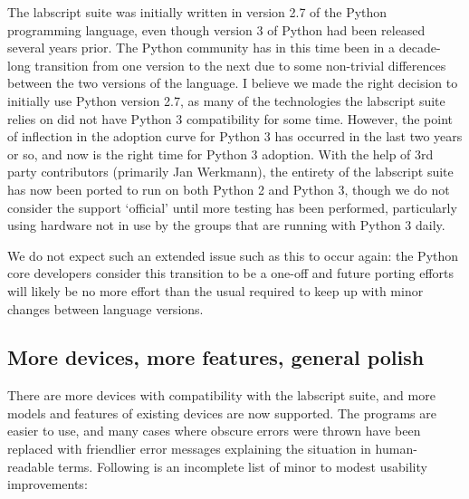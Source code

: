 The labscript suite was initially written in version 2.7 of the Python programming language, even though version 3 of Python had been released several years prior. The Python community has in this time been in a decade-long transition from one version to the next due to some non-trivial differences between the two versions of the language. I believe we made the right decision to initially use Python version 2.7, as many of the technologies the labscript suite relies on did not have Python 3 compatibility for some time. However, the point of inflection in the adoption curve for Python 3 has occurred in the last two years or so, and now is the right time for Python 3 adoption. With the help of 3rd party contributors (primarily Jan Werkmann), the entirety of the labscript suite has now been ported to run on both Python 2 and Python 3, though we do not consider the support `official' until more testing has been performed, particularly using hardware not in use by the groups that are running with Python 3 daily.

We do not expect such an extended issue such as this to occur again: the Python core developers consider this transition to be a one-off and future porting efforts will likely be no more effort than the usual required to keep up with minor changes between language versions.

\subsection{More devices, more features, general polish}

There are more devices with compatibility with the labscript suite, and more models and features of existing devices are now supported. The programs are easier to use, and many cases where obscure errors were thrown have been replaced with friendlier error messages explaining the situation in human-readable terms. Following is an incomplete list of minor to modest usability improvements:

